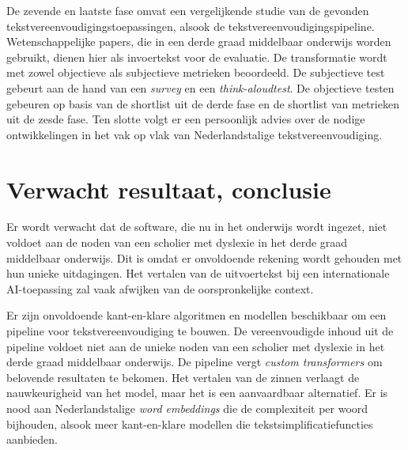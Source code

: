 De zevende en laatste fase omvat een vergelijkende studie van de gevonden tekstvereenvoudigingstoepassingen, alsook de tekstvereenvoudigingspipeline. Wetenschappelijke papers, die in een derde graad middelbaar onderwijs worden gebruikt, dienen hier als invoertekst voor de evaluatie. De transformatie wordt met zowel objectieve als subjectieve metrieken beoordeeld. De subjectieve test gebeurt aan de hand van een \textit{survey} en een \textit{think-aloudtest}. De objectieve testen gebeuren op basis van de shortlist uit de derde fase en de shortlist van metrieken uit de zesde fase. Ten slotte volgt er een persoonlijk advies over de nodige ontwikkelingen in het vak op vlak van Nederlandstalige tekstvereenvoudiging.

\section{Verwacht resultaat, conclusie}
\label{sec:verwachte_resultaten}

Er wordt verwacht dat de software, die nu in het onderwijs wordt ingezet, niet voldoet aan de noden van een scholier met dyslexie in het derde graad middelbaar onderwijs. Dit is omdat er onvoldoende rekening wordt gehouden met hun unieke uitdagingen. Het vertalen van de uitvoertekst bij een internationale AI-toepassing zal vaak afwijken van de oorspronkelijke context. 

Er zijn onvoldoende kant-en-klare algoritmen en modellen beschikbaar om een pipeline voor tekstvereenvoudiging te bouwen. De vereenvoudigde inhoud uit de pipeline voldoet niet aan de unieke noden van een scholier met dyslexie in het derde graad middelbaar onderwijs. De pipeline vergt \textit{custom transformers} om belovende resultaten te bekomen. Het vertalen van de zinnen verlaagt de nauwkeurigheid van het model, maar het is een aanvaardbaar alternatief. Er is nood aan Nederlandstalige \textit{word embeddings} die de complexiteit per woord bijhouden, alsook meer kant-en-klare modellen die tekstsimplificatiefuncties aanbieden.